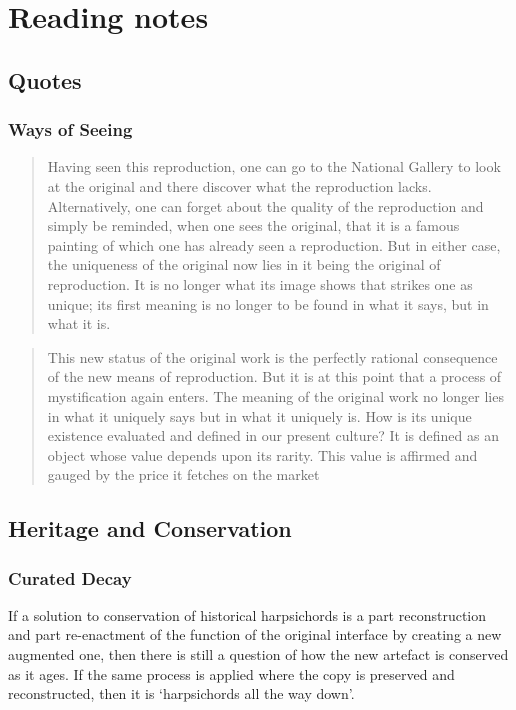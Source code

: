 \chapter{Reading notes}

\section{Quotes}

\subsection{Ways of Seeing}

\begin{quotation}
    Having seen this reproduction, one can go to the National Gallery to look at
the original and there discover what the reproduction lacks. Alternatively, one
can forget about the quality of the reproduction and simply be reminded, when
one sees the original, that it is a famous painting of which one has already
seen a reproduction. But in either case, the uniqueness of the original now lies
in it being the original of reproduction. It is no longer what its image shows
that strikes one as unique; its first meaning is no longer to be found in what
it says, but in what it is.
\end{quotation}

\begin{quotation}
This new status of the original work is the perfectly rational consequence of
the new means of reproduction. But it is at this point that a process of
mystification again enters. The meaning of the original work no longer lies in
what it uniquely says but in what it uniquely is. How is its unique existence
evaluated and defined in our present culture? It is defined as an object whose
value depends upon its rarity. This value is affirmed and gauged by the price it
fetches on the market
\end{quotation}

\section{Heritage and Conservation}

\subsection{Curated Decay \cite{desilvey_curated_2017}}

If a solution to conservation of historical harpsichords is a part
reconstruction and part re-enactment of the function of the original interface
by creating a new augmented one, then there is still a question of how the new
artefact is conserved as it ages. If the same process is applied where the copy
is preserved and reconstructed, then it is `harpsichords all the way down'.


